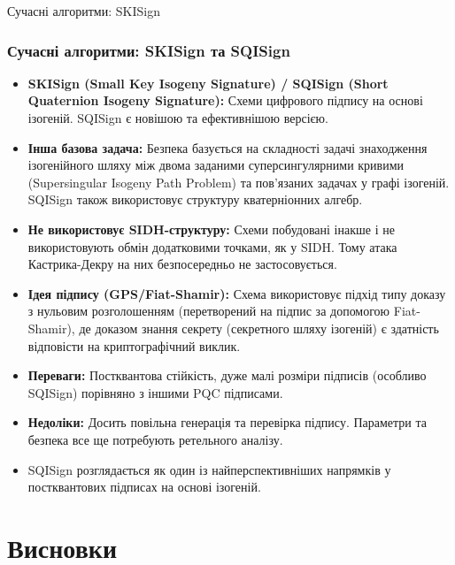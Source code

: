 \documentclass[9pt]{beamer}
\begin{document}
\begin{darkframes}
\begin{frame}{Сучасні алгоритми: SKISign}
  \frametitle{Сучасні алгоритми: SKISign та SQISign}
  \begin{itemize}
    \item \textbf{SKISign (Small Key Isogeny Signature) / SQISign (Short Quaternion Isogeny Signature):} Схеми цифрового підпису на основі ізогеній. SQISign є новішою та ефективнішою версією.
    \item \textbf{Інша базова задача:} Безпека базується на складності задачі знаходження ізогенійного шляху між двома заданими суперсингулярними кривими (Supersingular Isogeny Path Problem) та пов'язаних задачах у графі ізогеній. SQISign також використовує структуру кватерніонних алгебр.
    \item \textbf{Не використовує SIDH-структуру:} Схеми побудовані інакше і не використовують обмін додатковими точками, як у SIDH. Тому атака Кастрика-Декру на них безпосередньо не застосовується.
    \item \textbf{Ідея підпису (GPS/Fiat-Shamir):} Схема використовує підхід типу доказу з нульовим розголошенням (перетворений на підпис за допомогою Fiat-Shamir), де доказом знання секрету (секретного шляху ізогеній) є здатність відповісти на криптографічний виклик.
    \item \textbf{Переваги:} Постквантова стійкість, дуже малі розміри підписів (особливо SQISign) порівняно з іншими PQC підписами.
    \item \textbf{Недоліки:} Досить повільна генерація та перевірка підпису. Параметри та безпека все ще потребують ретельного аналізу.
    \item SQISign розглядається як один із найперспективніших напрямків у постквантових підписах на основі ізогеній.
  \end{itemize}
\end{frame}

\section{Висновки}


\end{darkframes}
\end{document}
